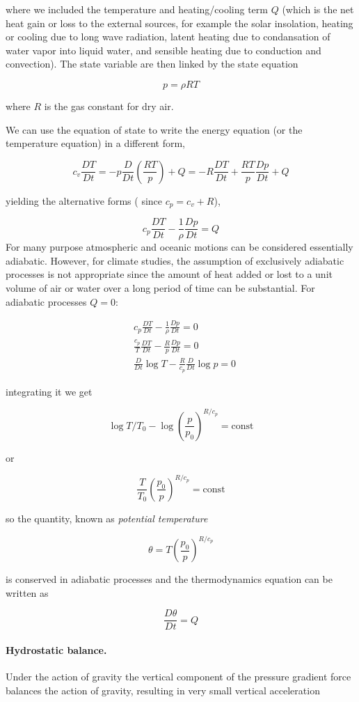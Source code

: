 where we included the temperature and heating/cooling term \(Q\) (which is the net heat gain or loss to the external sources, for example the solar insolation, heating or cooling due to long wave radiation, latent heating due to condansation of water vapor into liquid water, and sensible heating due to conduction and convection). The state variable are then linked by the state equation

\[p = \rho R T\]

where \(R\) is the gas constant for dry air.

We can use the equation of state to write the energy equation (or the temperature equation) in a different form,

\[c_v\frac{D T}{Dt} = -p\frac{D }{Dt}\left(\frac{R T}{p}\right)+ Q = -R\frac{D T}{Dt} + \frac{RT}{p}\frac{D p}{Dt} + Q\]

yielding the alternative forms ( since \(c_p = c_v +R\)),

\[c_p\frac{D T}{Dt}  - \frac{1}{\rho}\frac{D p}{Dt} = Q\]
For many purpose atmospheric and oceanic motions can be considered essentially adiabatic. However, for climate studies, the assumption of exclusively adiabatic processes is not appropriate since the amount of heat added or lost to a unit volume of air or water over a long period of time can be substantial. For adiabatic processes \(Q=0\):

\[\begin{aligned}
      &c_p\frac{D T}{Dt}  - \frac{1}{\rho}\frac{D p}{Dt} = 0\\
      &\frac{c_p}{T}\frac{D T}{Dt} -\frac{R}{p}\frac{D p}{Dt} = 0\\
      &\frac{D }{Dt}\log{T} - \frac{R}{c_p}\frac{D }{Dt}\log{p} = 0
\end{aligned}\]

integrating it we get

\[\log{T/T_0} - \log{\left(\frac{p}{p_0}\right)^{R/c_p}} = \text{const}\]

or

\[\frac{T}{T_0}\left(\frac{p_0}{p}\right)^{R/c_p} = \text{const}\]

so the quantity, known as \emph{potential temperature}

\[\theta = T\left(\frac{p_0}{p}\right)^{R/c_p}\]

is conserved in adiabatic processes and the thermodynamics equation can be written as

\[\frac{D \theta}{Dt} = Q\]

\paragraph{Hydrostatic balance.}
Under the action of gravity the vertical component of the pressure
gradient force balances the action of gravity, resulting in very small
vertical acceleration

